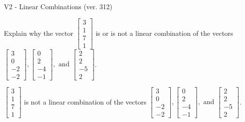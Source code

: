 \begin{exercise}
  \begin{exerciseTitle}V2 - Linear Combinations (ver. 312)\end{exerciseTitle}
  \begin{exerciseStatement}
    Explain why the vector \(\left[\begin{array}{c}
3 \\
1 \\
7 \\
1
\end{array}\right]\)  is or is not a linear 
	combination of the vectors \(\left[\begin{array}{c}
3 \\
0 \\
-2 \\
-2
\end{array}\right] , \left[\begin{array}{c}
0 \\
2 \\
-4 \\
-1
\end{array}\right] , \text{ and } \left[\begin{array}{c}
2 \\
2 \\
-5 \\
2
\end{array}\right]\).
	


  \end{exerciseStatement}
  \begin{exerciseAnswer}
   \(\left[\begin{array}{c}
3 \\
1 \\
7 \\
1
\end{array}\right]\) 
  	 is not  
	a linear combination of the vectors \(\left[\begin{array}{c}
3 \\
0 \\
-2 \\
-2
\end{array}\right] , \left[\begin{array}{c}
0 \\
2 \\
-4 \\
-1
\end{array}\right] , \text{ and } \left[\begin{array}{c}
2 \\
2 \\
-5 \\
2
\end{array}\right]\).

	
  


  \end{exerciseAnswer}
\end{exercise}